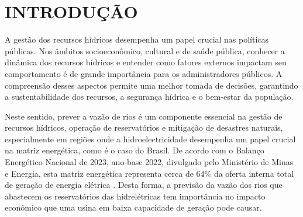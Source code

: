 \chapter{INTRODU\c{C}\~AO}  %

	



A gestão dos recursos hídricos desempenha um papel crucial nas políticas públicas. Nos âmbitos socioeconômico, cultural e de saúde pública, conhecer a dinâmica dos recursos hídricos e entender como fatores externos impactam seu comportamento é de grande importância para os administradores públicos. A compreensão desses aspectos permite uma melhor tomada de decisões, garantindo a sustentabilidade dos recursos, a segurança hídrica e o bem-estar da população.

Neste sentido, prever a vazão de rios é um componente essencial na gestão de recursos hídricos, operação de reservatórios e mitigação de desastres naturais, especialmente em regiões onde a hidroelectricidade desempenha um papel crucial na matriz energética, como é o caso do Brasil. De acordo com o Balanço Energético Nacional de 2023, ano-base 2022, divulgado pelo Ministério de Minas e Energia, esta matriz energética representa cerca de 64\% da oferta interna total de geração de energia elétrica \cite{epe2023ben}. Desta forma, a previsão da vazão dos rios que abastecem os reservatórios das hidrelétricas tem importância no impacto econômico que uma usina em baixa capacidade de geração pode causar.

